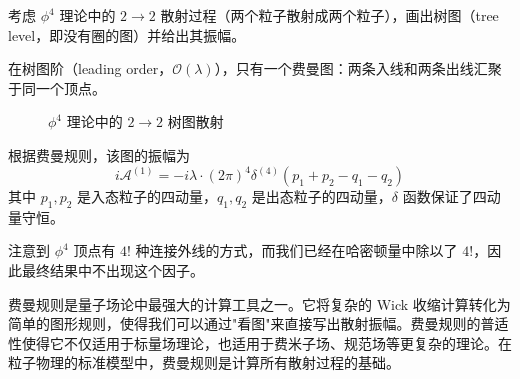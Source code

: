 \begin{example}
    考虑 $\phi^4$ 理论中的 $2 \to 2$ 散射过程（两个粒子散射成两个粒子），画出树图（tree level，即没有圈的图）并给出其振幅。
    \begin{solution}
        在树图阶（leading order，$\mathcal{O}(\lambda)$），只有一个费曼图：两条入线和两条出线汇聚于同一个顶点。

        \begin{figure}[htbp]
            \centering
            \caption{$\phi^4$ 理论中的 $2 \to 2$ 树图散射}
        \end{figure}

        根据费曼规则，该图的振幅为
        \begin{equation}
            i\mathcal{A}^{(1)} = -i\lambda \cdot (2\pi)^4\delta^{(4)}(p_1 + p_2 - q_1 - q_2)
        \end{equation}
        其中 $p_1, p_2$ 是入态粒子的四动量，$q_1, q_2$ 是出态粒子的四动量，$\delta$ 函数保证了四动量守恒。

        注意到 $\phi^4$ 顶点有 $4!$ 种连接外线的方式，而我们已经在哈密顿量中除以了 $4!$，因此最终结果中不出现这个因子。
    \end{solution}
\end{example}

\begin{remark}
    费曼规则是量子场论中最强大的计算工具之一。它将复杂的 Wick 收缩计算转化为简单的图形规则，使得我们可以通过"看图"来直接写出散射振幅。费曼规则的普适性使得它不仅适用于标量场理论，也适用于费米子场、规范场等更复杂的理论。在粒子物理的标准模型中，费曼规则是计算所有散射过程的基础。
\end{remark}








